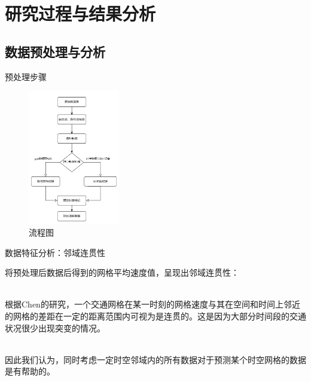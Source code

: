\documentclass[10pt]{beamer}
\begin{document}
\section{研究过程与结果分析}
\subsection{数据预处理与分析}
\begin{frame}{预处理步骤}
    \begin{figure}
        \centering
        \includegraphics[width=4cm]{pic/流程图.png}
        \caption{流程图}
        \label{fig.workflow}
    \end{figure}
\end{frame}

\begin{frame}{数据特征分析：邻域连贯性}
    \par 将预处理后数据后得到的\alert{网格平均速度值}，呈现出\alert{邻域连贯性}：
    \\ \hspace*{\fill} \\
    \par 根据Chen的研究，一个交通网格在某一时刻的网格速度与其在空间和时间上邻近的网格的差距在一定的距离范围内可视为是连贯的。这是因为大部分时间段的交通状况很少出现突变的情况。
    \\ \hspace*{\fill} \\
    \par 因此我们认为，同时考虑\alert{一定时空邻域内的所有数据}对于预测某个时空网格的数据是有帮助的。
\end{frame}
\end{document}
